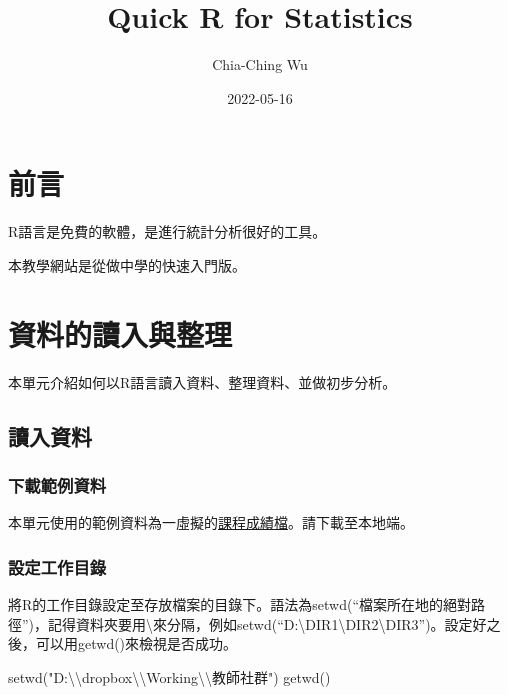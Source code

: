 \documentclass[
]{book}
\title{Quick R for Statistics}
\author{Chia-Ching Wu}
\date{2022-05-16}
\newenvironment{Shaded}{\begin{snugshade}}{\end{snugshade}}
\newcommand{\FunctionTok}[1]{\textcolor[rgb]{0.00,0.00,0.00}{#1}}
\newcommand{\NormalTok}[1]{#1}
\newcommand{\SpecialCharTok}[1]{\textcolor[rgb]{0.00,0.00,0.00}{#1}}
\newcommand{\StringTok}[1]{\textcolor[rgb]{0.31,0.60,0.02}{#1}}
\begin{document}
\maketitle

{
\setcounter{tocdepth}{1}
\tableofcontents
}
\hypertarget{ux524dux8a00}{%
\chapter*{前言}\label{ux524dux8a00}}

R語言是免費的軟體，是進行統計分析很好的工具。

本教學網站是從做中學的快速入門版。

\hypertarget{datainput}{%
\chapter{資料的讀入與整理}\label{datainput}}

本單元介紹如何以R語言讀入資料、整理資料、並做初步分析。

\hypertarget{ux8b80ux5165ux8cc7ux6599}{%
\section{讀入資料}\label{ux8b80ux5165ux8cc7ux6599}}

\hypertarget{ux4e0bux8f09ux7bc4ux4f8bux8cc7ux6599}{%
\subsection{下載範例資料}\label{ux4e0bux8f09ux7bc4ux4f8bux8cc7ux6599}}

本單元使用的範例資料為一虛擬的\href{https://docs.google.com/spreadsheets/d/1OMVwYZlCmgamESSUUR62tAF_Q_8NabZQ/edit\#gid=506295809}{課程成績檔}。請下載至本地端。

\hypertarget{ux8a2dux5b9aux5de5ux4f5cux76eeux9304}{%
\subsection{設定工作目錄}\label{ux8a2dux5b9aux5de5ux4f5cux76eeux9304}}

將R的工作目錄設定至存放檔案的目錄下。語法為setwd(``檔案所在地的絕對路徑'')，記得資料夾要用\textbackslash 來分隔，例如setwd(``D:\textbackslash DIR1\textbackslash DIR2\textbackslash DIR3'')。設定好之後，可以用getwd()來檢視是否成功。

\begin{Shaded}
\begin{Highlighting}[]
\FunctionTok{setwd}\NormalTok{(}\StringTok{"D:}\SpecialCharTok{\textbackslash{}\textbackslash{}}\StringTok{dropbox}\SpecialCharTok{\textbackslash{}\textbackslash{}}\StringTok{Working}\SpecialCharTok{\textbackslash{}\textbackslash{}}\StringTok{教師社群"}\NormalTok{)}
\FunctionTok{getwd}\NormalTok{()}
\end{Highlighting}
\end{Shaded}
\end{document}
